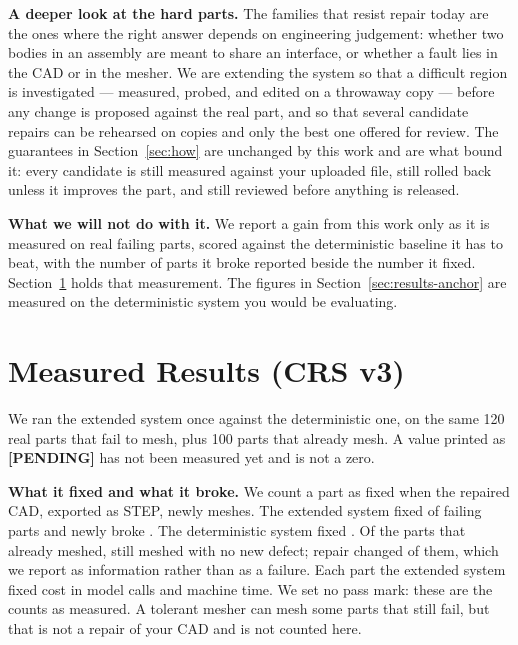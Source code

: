 \documentclass[10pt,onecolumn]{article}
\newcommand{\topic}[1]{\textbf{#1.}\hspace{0.5em}\ignorespaces}
\begin{document}
\topic{A deeper look at the hard parts} The families that resist repair today are the ones where the
right answer depends on engineering judgement: whether two bodies in an assembly are meant to share
an interface, or whether a fault lies in the CAD or in the mesher. We are extending the system so
that a difficult region is investigated --- measured, probed, and edited on a throwaway copy ---
before any change is proposed against the real part, and so that several candidate repairs can be
rehearsed on copies and only the best one offered for review. The guarantees in
Section~\ref{sec:how} are unchanged by this work and are what bound it: every candidate is still
measured against your uploaded file, still rolled back unless it improves the part, and still
reviewed before anything is released.

\topic{What we will not do with it} We report a gain from this work only as it is measured on real
failing parts, scored against the deterministic baseline it has to beat, with the number of parts it
broke reported beside the number it fixed. Section~\ref{sec:v3brief} holds that measurement. The
figures in Section~\ref{sec:results-anchor} are measured on the deterministic system you would be
evaluating.

\section{Measured Results (CRS v3)}\label{sec:v3brief}



We ran the extended system once against the deterministic one, on the same 120 real parts that fail
to mesh, plus 100 parts that already mesh. A value printed as \textbf{[PENDING]} has not been
measured yet and is not a zero.

\topic{What it fixed and what it broke} We count a part as fixed when the repaired CAD, exported
as STEP, newly meshes. The extended system fixed \vThreeFilesFixed{} of \vThreeNFiles{} failing
parts and newly broke \vThreeNewlyBroken. The deterministic system fixed \vThreeDetFilesFixed. Of
the \vThreeCleanNFiles{} parts that already meshed, \vThreeCleanStillGood{} still meshed with no new
defect; repair changed \vThreeCleanChanged{} of them, which we report as information rather than as a
failure. Each part the extended system fixed cost \vThreeCostPerFixed{} in model calls and machine
time. We set no pass mark: these are the counts as measured. A tolerant mesher can mesh some parts
that still fail, but that is not a repair of your CAD and is not counted here.
\end{document}
